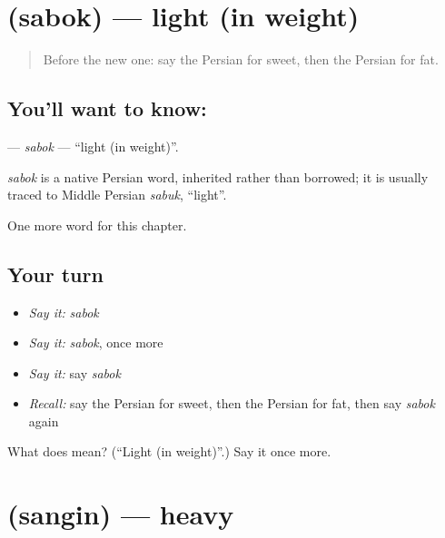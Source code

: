 \section[\texorpdfstring{\fa{سبک} (sabok)}{سبک (sabok)}]{ (sabok) — light (in weight)}

\label{lesson:FA-C62-sabok}



\begin{quote}
Before the new one: say the Persian for sweet, then the Persian for fat.
\end{quote}

\subsection*{You'll want to know: }
\textbf{} — \emph{sabok} — \textquotedblleft{}light (in weight)\textquotedblright{}.

\begin{cousinweb}
\emph{sabok} is a native Persian word, inherited rather than borrowed; it is usually traced to Middle Persian \emph{sabuk}, \textquotedblleft{}light\textquotedblright{}.
\end{cousinweb}

\begin{grammarlens}[title={What you've built}]
One more word for this chapter.
\end{grammarlens}

\subsection*{Your turn}
\begin{itemize}
\raggedright
  \item \emph{Say it:} \emph{sabok}
  \item \emph{Say it:} \emph{sabok}, once more
  \item \emph{Say it:} say \emph{sabok}
  \item \emph{Recall:} say the Persian for sweet, then the Persian for fat, then say \emph{sabok} again
\end{itemize}

\begin{tcolorbox}[breakable,colback=teal!4,colframe=teal!35!black,title={Before you move on}]
What does  mean? (\textquotedblleft{}Light (in weight)\textquotedblright{}.) Say it once more.
\end{tcolorbox}
\section[\texorpdfstring{\fa{سنگین} (sangin)}{سنگین (sangin)}]{ (sangin) — heavy}


